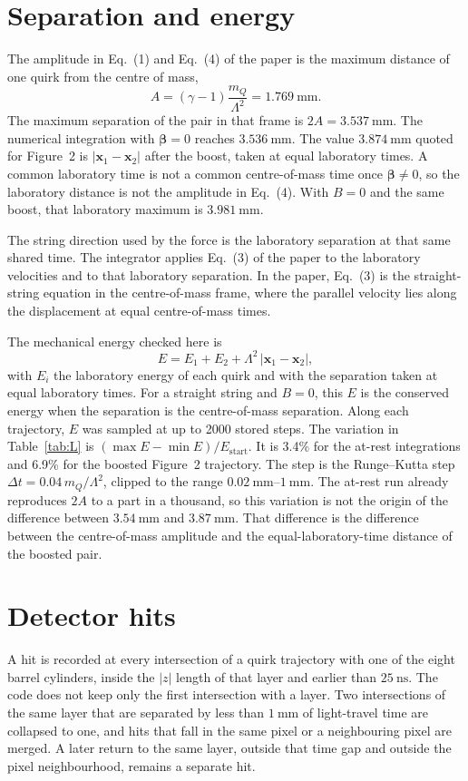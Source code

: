 \documentclass[11pt,a4paper]{article}
\begin{document}
\section{Separation and energy}
The amplitude in Eq.~(1) and Eq.~(4) of the paper is the maximum distance of one quirk from the centre of mass,
\[
A = (\gamma-1)\frac{m_Q}{\Lambda^{2}} = \SI{1.769}{\mm}.
\]
The maximum separation of the pair in that frame is \(2A = \SI{3.537}{\mm}\).
The numerical integration with \(\boldsymbol{\beta} = 0\) reaches \(\SI{3.536}{\mm}\).
The value \(\SI{3.874}{\mm}\) quoted for Figure~2 is \(|\mathbf{x}_1-\mathbf{x}_2|\) after the boost, taken at equal laboratory times.
A common laboratory time is not a common centre-of-mass time once \(\boldsymbol{\beta}\neq 0\), so the laboratory distance is not the amplitude in Eq.~(4).
With \(B = 0\) and the same boost, that laboratory maximum is \(\SI{3.981}{\mm}\).

The string direction used by the force is the laboratory separation at that same shared time.
The integrator applies Eq.~(3) of the paper to the laboratory velocities and to that laboratory separation.
In the paper, Eq.~(3) is the straight-string equation in the centre-of-mass frame, where the parallel velocity lies along the displacement at equal centre-of-mass times.

The mechanical energy checked here is
\[
E = E_1 + E_2 + \Lambda^{2}\,|\mathbf{x}_1-\mathbf{x}_2|,
\]
with \(E_i\) the laboratory energy of each quirk and with the separation taken at equal laboratory times.
For a straight string and \(B = 0\), this \(E\) is the conserved energy when the separation is the centre-of-mass separation.
Along each trajectory, \(E\) was sampled at up to 2000 stored steps.
The variation in Table~\ref{tab:L} is \((\max E - \min E)/E_{\mathrm{start}}\).
It is 3.4\% for the at-rest integrations and 6.9\% for the boosted Figure~2 trajectory.
The step is the Runge--Kutta step \(\Delta t = 0.04\, m_Q/\Lambda^{2}\), clipped to the range \(\SI{0.02}{\mm}\)--\(\SI{1}{\mm}\).
The at-rest run already reproduces \(2A\) to a part in a thousand, so this variation is not the origin of the difference between \(\SI{3.54}{\mm}\) and \(\SI{3.87}{\mm}\).
That difference is the difference between the centre-of-mass amplitude and the equal-laboratory-time distance of the boosted pair.

\section{Detector hits}
A hit is recorded at every intersection of a quirk trajectory with one of the eight barrel cylinders, inside the \(|z|\) length of that layer and earlier than \(\SI{25}{\ns}\).
The code does not keep only the first intersection with a layer.
Two intersections of the same layer that are separated by less than \(\SI{1}{\mm}\) of light-travel time are collapsed to one, and hits that fall in the same pixel or a neighbouring pixel are merged.
A later return to the same layer, outside that time gap and outside the pixel neighbourhood, remains a separate hit.
\end{document}
